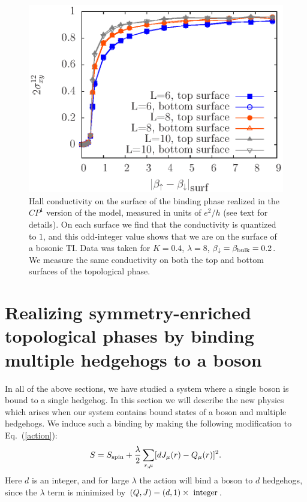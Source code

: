 \begin{figure}
\includegraphics[width=\linewidth]{figures/cp1hall.eps}
\caption{Hall conductivity on the surface of the binding phase realized in the $CP^1$ version of the model, measured in units of $e^2/h$ (see text for details). On each surface we find that the conductivity is quantized to $1$, and this odd-integer value shows that we are on the surface of a bosonic TI. Data was taken for $K=0.4$, $\lambda=8$, $\beta_\downarrow=\beta_{\rm bulk}=0.2$. We measure the same conductivity on both the top and bottom surfaces of the topological phase.
}
\label{cp1hall}
\end{figure}


\section{Realizing symmetry-enriched topological phases by binding multiple hedgehogs to a boson}
\label{section::multiple}

In all of the above sections, we have studied a system where a single boson is bound to a single hedgehog. In this section we will describe the new physics which arises when our system contains bound states of a boson and multiple hedgehogs. We induce such a binding by making the following modification to Eq.~(\ref{action}):
\begin{equation}
S=S_{\rm spin}+\frac{\lambda}{2}\sum_{r,\mu} [ dJ_\mu(r)- Q_\mu(r)]^2.
\label{cdbind}
\end{equation}
Here $d$ is an integer, and for large $\lambda$ the action will bind a boson to $d$ hedgehogs, since the $\lambda$ term is minimized by $(Q, J) = (d, 1) \times~{\rm integer}$. 

